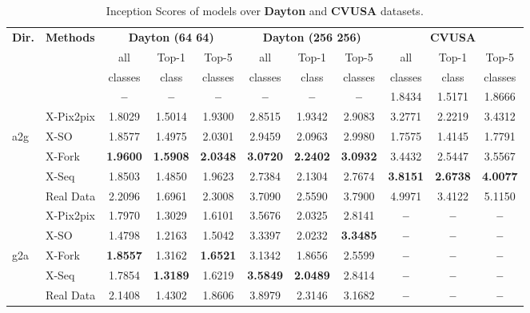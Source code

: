 \documentclass[times,twocolumn,final,authoryear]{elsarticle_modified}
\begin{document}
\begin{table*}[t]
\small
  \renewcommand{\arraystretch}{.7}
  \centering
  \caption{\small Inception Scores of models over {\bf Dayton} and {\bf CVUSA} datasets.}
  \vspace{-10pt}
  \label{tab:inception_score}
    \begin{tabular*}{\textwidth}{l @{\extracolsep{\fill}} lccccccccc}
        \toprule
              \multicolumn{1}{l}{\textbf{Dir.}} & \multicolumn{1}{l}{\textbf{Methods}} & \multicolumn{3}{c}{\textbf{Dayton (64  64)}} & \multicolumn{3}{c}{\textbf{Dayton (256  256)}} & \multicolumn{3}{c}{\textbf{CVUSA}}     \\
                \cmidrule(lr){3-5}
\cmidrule(lr){6-8} \cmidrule(lr){9-11}
         & & all  & Top-1  & Top-5  & all  & Top-1  & Top-5  & all  & Top-1  & Top-5  \\
         & &  classes &  class &  classes &  classes &  class &  classes &  classes &  class &  classes \\
        \midrule
      &  \cite{zhai2017crossview} & \textbf{--} & \textbf{--} & \textbf{--} & \textbf{--} & \textbf{--} & \textbf{--} & 1.8434 & 1.5171 & 1.8666\\
      &  X-Pix2pix  & 1.8029 & 1.5014 & 1.9300 & 2.8515 & 1.9342 & 2.9083 & 3.2771 & 2.2219 & 3.4312 \\
   a2g &  X-SO & {1.8577} & {1.4975} & {2.0301} & {2.9459} & {2.0963} & {2.9980} & 1.7575 & 1.4145 & 1.7791 \\
    &  X-Fork & \textbf{1.9600} & \textbf{1.5908} & \textbf{2.0348} & \textbf{3.0720} & \textbf{2.2402} & \textbf{3.0932} & 3.4432 & 2.5447 & 3.5567\\
   &  X-Seq & 1.8503 & 1.4850 & 1.9623 & 2.7384 & 2.1304 & 2.7674 & \textbf{3.8151} & \textbf{2.6738} & \textbf{4.0077}\\
    \cmidrule(lr){2-11}
   &  Real Data & 2.2096 & 1.6961 & 2.3008 & 3.7090 & 2.5590 & 3.7900 & 4.9971 & 3.4122 & 5.1150\\
     \midrule
  &  X-Pix2pix  & 1.7970 & 1.3029 & 1.6101 & 3.5676 & 2.0325 & 2.8141 & \textbf{--} & \textbf{--} & \textbf{--} \\
   &   X-SO & 1.4798 & 1.2163 & 1.5042 & 3.3397 & 2.0232 & \textbf{3.3485} & \textbf{--} & \textbf{--} & \textbf{--}\\
 g2a  &   X-Fork & \textbf{1.8557} & {1.3162} & \textbf{1.6521} & 3.1342 & 1.8656 & 2.5599 & \textbf{--} & \textbf{--} & \textbf{--}\\
  &   X-Seq & 1.7854 & \textbf{1.3189} & 1.6219 & \textbf{3.5849} & \textbf{2.0489} & {2.8414} & \textbf{--} & \textbf{--} & \textbf{--}\\
    \cmidrule(lr){2-11}
  &   Real Data & 2.1408 & 1.4302 & 1.8606 & 3.8979 & 2.3146 & 3.1682 & \textbf{--} & \textbf{--} & \textbf{--}\\
        \bottomrule
    \end{tabular*}
\end{table*}
\end{document}
